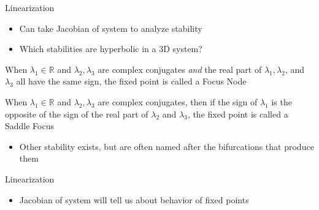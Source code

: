 \documentclass{beamer}
\newcommand{\RR}{\mathbb{R}}
\begin{document}
\begin{frame}{Linearization}
    \begin{itemize}
        \item Can take Jacobian of system to analyze stability
        \pause
        \item Which stabilities are hyperbolic in a 3D system?
        \pause
    \end{itemize}
    \begin{definition}
        When $\lambda_{1}\in\RR$ and $\lambda_{2},\lambda_{3}$ are complex conjugates \textit{and} the real part of $\lambda_{1},\lambda_{2}$, and $\lambda_{3}$ all have the same sign, the fixed point is called a \alert{Focus Node}
    \end{definition}
    \pause
    \begin{definition}
        When $\lambda_{1}\in\RR$ and $\lambda_{2},\lambda_{3}$ are complex conjugates, then if the sign of $\lambda_{1}$ is the opposite of the sign of the real part of $\lambda_{2}$ and $\lambda_{3}$, the fixed point is called a \alert{Saddle Focus}
    \end{definition}
    \pause
    \begin{itemize}
        \item Other stability exists, but are often named after the bifurcations that produce them
    \end{itemize}
\end{frame}

\begin{frame}{Linearization}
    \begin{itemize}
        \item Jacobian of system will tell us about behavior of fixed points
    \end{itemize}
    
\end{frame}
\end{document}
